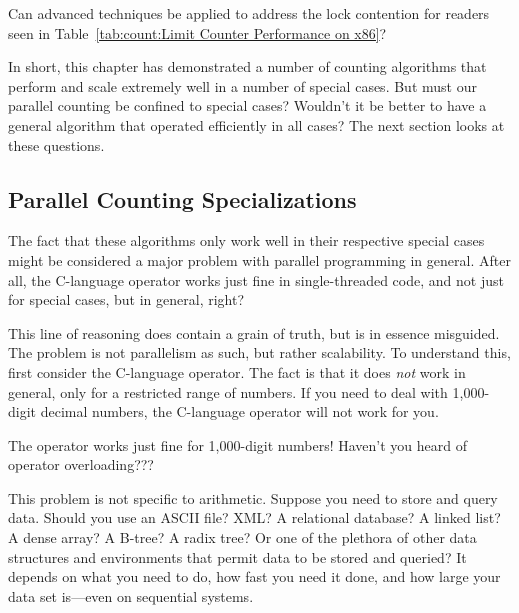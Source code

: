 \QuickQuiz{}
	Can advanced techniques be applied to address the lock
	contention for readers seen in
	Table~\ref{tab:count:Limit Counter Performance on x86}?
 \QuickQuizEnd

In short, this chapter has demonstrated a number of counting algorithms
that perform and scale extremely well in a number of special cases.
But must our parallel counting be confined to special cases?
Wouldn't it be better to have a general algorithm that operated
efficiently in all cases?
The next section looks at these questions.

\subsection{Parallel Counting Specializations}
\label{sec:count:Parallel Counting Specializations}

The fact that these algorithms only work well in their respective special
cases might be considered a major problem with parallel programming in
general.
After all, the C-language \co{++} operator works just fine in single-threaded
code, and not just for special cases, but in general, right?

This line of reasoning does contain a grain of truth, but is in essence
misguided.
The problem is not parallelism as such, but rather scalability.
To understand this, first consider the C-language \co{++} operator.
The fact is that it does \emph{not} work in general, only for a restricted
range of numbers.
If you need to deal with 1,000-digit decimal numbers, the C-language \co{++}
operator will not work for you.

\QuickQuiz{}
	The \co{++} operator works just fine for 1,000-digit numbers!
	Haven't you heard of operator overloading???
 \QuickQuizEnd

This problem is not specific to arithmetic.
Suppose you need to store and query data.
Should you use an ASCII file? 
XML?
A relational database?
A linked list?
A dense array?
A B-tree?
A radix tree?
Or one of the plethora of other data
structures and environments that permit data to be stored and queried?
It depends on what you need to do, how fast you need it done, and how
large your data set is---even on sequential systems.

